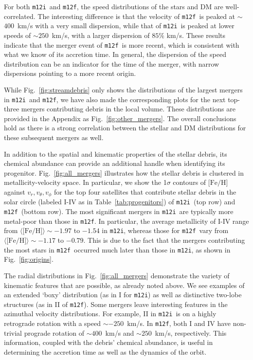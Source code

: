 \documentclass[twocolumn,preprintnumbers]{aastex6}
\newcommand{\FeH}{\text{[Fe/H]} }
\DeclareRobustCommand{\Tab}[1]{Table~\ref{#1}}
\DeclareRobustCommand{\Fig}[1]{Fig.~\ref{#1}}
\def\ML#1{\textcolor{red}{[ML: #1]}}
\newcommand{\mi}{\texttt{m12i}}
\newcommand{\mf}{\texttt{m12f}}
\begin{document}
For both \mi~and \mf, the speed distributions of the stars and DM are well-correlated.  The interesting difference is that the velocity of \mf~is peaked at $\sim$$400$~km/s with a very small dispersion, while that of \mi~is peaked at lower speeds of $\sim$$250$~km/s, with a larger dispersion of $85\%$ km/s. These results indicate that the merger event of \mf~is more recent, which is consistent with what we know of its accretion time.  In general, the dispersion of the speed distribution can be an indicator for the time of the merger, with narrow dispersions pointing to a more recent origin.  

While \Fig{fig:streamdebris} only shows the distributions of the largest mergers in \mi~and \mf, we have also made the corresponding plots for the next top-three mergers contributing debris in the local volume.  These distributions are provided in the Appendix as \Fig{fig:other_mergers}.  The overall conclusions hold as there is a strong correlation between the stellar and DM distributions for these subsequent mergers as well.

In addition to the spatial and kinematic properties of the stellar debris, its chemical abundance can provide an additional handle when identifying its progenitor.  \Fig{fig:all_mergers} illustrates how the stellar debris is clustered in metallicity-velocity space.  In particular, we show the 1$\sigma$ contours of $\FeH$ against $v_r, v_\theta, v_\phi$ for the top four satellites that contribute stellar debris in the solar circle (labeled I-IV as in \Tab{tab:progenitors}) of \mi~(top row) and \mf~(bottom row).  The most significant mergers in \mi~are typically more metal-poor than those in \mf.  In particular, the average metallicity of I-IV range from $\langle \FeH \rangle \sim -1.97$ to $-1.54 $ in \mi, whereas those for \mf~vary from $\langle \FeH \rangle \sim-1.17$ to $-0.79$. This is due to the fact that the mergers contributing the most stars in \mf~occurred much later than those in \mi, as shown in \Fig{fig:origins}.  %

The radial distributions in \Fig{fig:all_mergers} demonstrate the variety of kinematic features that are possible, as already noted above.  We see examples of an extended `boxy' distribution (as in I for \mi) as well as distinctive two-lobe structures (as in II of \mf).  Some mergers leave interesting features in the azimuthal velocity distributions.  For example, II in \mi~is on a highly retrograde rotation with a speed $\sim -250$~km/s. In \mf, both I and IV have non-trivial prograde rotation of $\sim 400$~km/s and $\sim 250$~km/s, respectively.  This information, coupled with the debris' chemical abundance, is useful in determining the accretion time as well as the dynamics of the orbit.  
\end{document}

